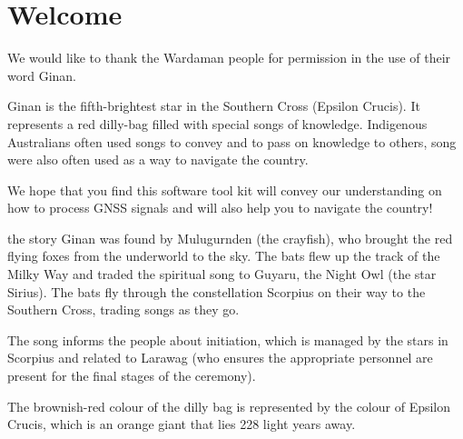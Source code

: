 \chapter{Welcome}
\label{ch:Ginan}

We would like to thank the Wardaman people for permission in the use of their word Ginan. 

Ginan is the fifth-brightest star in the Southern Cross (Epsilon Crucis). It represents a red dilly-bag filled with special songs of knowledge.
Indigenous Australians often used songs to convey and to pass on knowledge to others, song were also often used as a way to navigate the country.

We hope that you find this software tool kit will convey our understanding on how to process GNSS signals and will also help you to navigate the country!

the story Ginan was found by Mulugurnden (the crayfish), who brought the red flying foxes from the underworld to the sky. The bats flew up the track of the Milky Way and traded the spiritual song to Guyaru, the Night Owl (the star Sirius). The bats fly through the constellation Scorpius on their way to the Southern Cross, trading songs as they go.

The song informs the people about initiation, which is managed by the stars in Scorpius and related to Larawag (who ensures the appropriate personnel are present for the final stages of the ceremony).

The brownish-red colour of the dilly bag is represented by the colour of Epsilon Crucis, which is an orange giant that lies 228 light years away.

